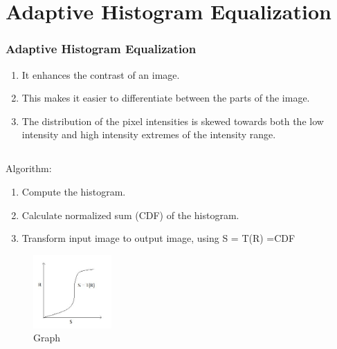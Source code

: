 \documentclass[12pt]{beamer}
\begin{document}
\section{Adaptive Histogram Equalization}
\begin{frame}[c]
\frametitle{Adaptive Histogram Equalization}
\begin{enumerate}
\item \vskip-30pt It enhances the contrast of an image.
\item This makes it easier to differentiate between the parts of the image.
\item The distribution of the pixel intensities is skewed towards both the low intensity and high intensity extremes of the intensity range.
\end{enumerate}
\end{frame}


\subsection{}
\begin{frame}[c]
\frametitle{}
Algorithm:\\[12pt]
\begin{enumerate}
\item Compute the histogram.
\item Calculate normalized sum (CDF) of the histogram.
\item Transform input image to output image, using S = T(R) =CDF
\end{enumerate}
\begin{figure}
 \centering
 
 \includegraphics[width=3cm]{./ah.jpg}
 \caption{Graph}
\end{figure}
\end{frame}
\end{document}
